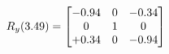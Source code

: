\documentclass[preview]{standalone}
\begin{document}
\begin{align*}
\special{dvisvgm:raw <g id='unique000'>}R_{y}(3.49) = \begin{bmatrix}-0.94 & 0 & -0.34 \\0 & 1 & 0 \\+0.34 & 0 & -0.94\end{bmatrix}\special{dvisvgm:raw </g>}
\end{align*}
\end{document}
